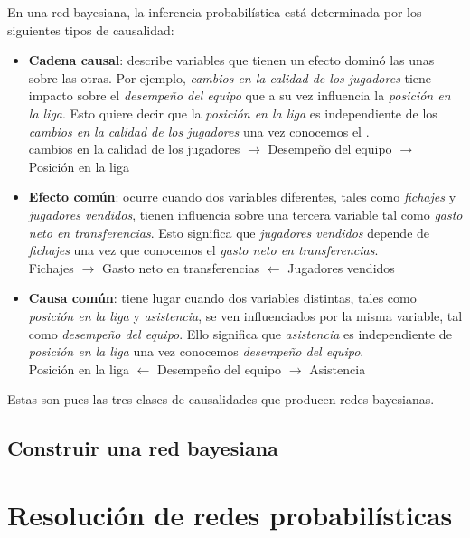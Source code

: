En una red bayesiana, la inferencia probabilística está determinada por los siguientes tipos de causalidad: 
\begin{itemize}
    \item \textbf{Cadena causal}: describe variables que tienen un efecto dominó las unas sobre las otras. Por ejemplo, \textit{cambios en la calidad de 
    los jugadores} tiene impacto sobre el \textit{desempeño del equipo} que a su vez influencia la \textit{posición en la liga}. 
    Esto quiere decir que la \textit{posición en la liga} es independiente de los \textit{cambios en la calidad de los jugadores} una vez conocemos el .\\
    cambios en la calidad de los jugadores $\rightarrow$ Desempeño del equipo $\rightarrow$ Posición en la liga
    \item \textbf{Efecto común}: ocurre cuando dos variables diferentes, tales como \textit{fichajes} y \textit{jugadores vendidos}, tienen influencia sobre una tercera variable tal como 
    \textit{gasto neto en transferencias}. Esto significa que \textit{jugadores vendidos} depende de \textit{fichajes} una vez que conocemos el \textit{gasto neto en transferencias}.\\
    Fichajes $\rightarrow$ Gasto neto en transferencias $\leftarrow$ Jugadores vendidos    
    \item \textbf{Causa común}: tiene lugar cuando dos variables distintas, tales como \textit{posición en la liga} y \textit{asistencia}, se ven influenciados por la misma variable, tal 
    como \textit{desempeño del equipo}. Ello significa que \textit{asistencia} es independiente de \textit{posición en la liga} una vez conocemos \textit{desempeño del equipo}.\\
    Posición en la liga $\leftarrow$ Desempeño del equipo $\rightarrow$ Asistencia
\end{itemize}

Estas son pues las tres clases de causalidades que producen redes bayesianas.

\subsection{Construir una red bayesiana}


\section{Resolución de redes probabilísticas}

